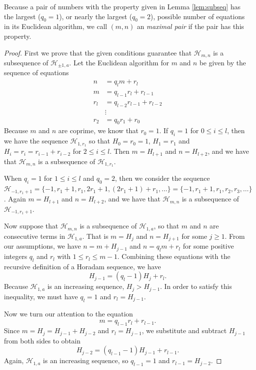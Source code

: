 \documentclass{amsart}
\begin{document}
Because a pair of numbers with the property given in Lemma \ref{lem:subseq} has the largest ($q_0 = 1$), or nearly the largest ($q_0 = 2$), possible number of equations in its Euclidean algorithm, we call $(m,n)$ an \textit{maximal pair} if the pair has this property. 

\begin{proof}
First we prove that the given conditions guarantee that $\mathcal H_{m,n}$ is a subsequence of $\mathcal H_{\pm 1, a}$. Let the Euclidean algorithm for $m$ and $n$ be given by the sequence of equations 
 \begin{align*} 
n &=   q_l m + r_l\\ 
m &=  q_{l-1} r_l + r_{l-1} \\
r_l &= q_{l-2} r_{l-1} + r_{l-2} \\
& \vdots \\
r_2 &= q_0 r_1 + r_0
\end{align*}
Because $m$ and $n$ are coprime, we know that $r_0 = 1$. If $q_i = 1$ for $0\le i \le l$, then we have the sequence $\mathcal H_{1, r_1}$ so that $H_0 = r_0 = 1$, $H_1 = r_1$ and $H_i = r_i = r_{i - 1} + r_{i-2}$ for $2 \le i \le l$. Then $m = H_{l+1}$ and $n = H_{l+2}$, and we have that $\mathcal H_{m,n}$ is a subsequence of $\mathcal H_{1, r_1}$.

When $q_i = 1$ for $1\le i \le l$ and $q_0 = 2$, then we consider the sequence $\mathcal H_{-1, r_1 + 1} = \{-1, r_1 + 1, r_1,  2r_1 + 1, (2r_1 + 1) + r_1, \ldots \} = \{-1, r_1 + 1, r_1,  r_2, r_3, \ldots \}$. Again $m = H_{l+1}$ and $n = H_{l+2}$, and we have that $\mathcal H_{m,n}$ is a subsequence of $\mathcal H_{-1, r_1 + 1}$.

Now suppose that $\mathcal H_{m,n}$ is a subsequence of $\mathcal H_{1, a}$, so that $m$ and $n$ are consecutive terms in $\mathcal H_{1, a}$. That is $m = H_j $ and $n = H_{j+1} $ for some $j\ge 1$. From our assumptions, we have $n = m + H_{j-1}$ and $n = q_l m + r_l$ for some positive integers $q_l$ and $r_l$ with $1\le r_l \le m-1$. Combining these equations with the recursive definition of a Horadam sequence, we have  $$H_{j-1} = (q_l - 1) H_j + r_l .$$ Because $\mathcal H_{1, a}$ is an increasing sequence, $H_{j} > H_{j-1} $. In order to satisfy this inequality, we must have $q_l = 1$ and $r_l = H_{j-1}$. 

Now we turn our attention to the equation $$m = q_{l-1} r_l + r_{l-1}.$$ Since $m = H_j = H_{j-1} + H_{j-2}$ and $r_l = H_{j-1}$, we substitute and subtract $H_{j-1}$ from both sides to obtain $$H_{j-2} = (q_{l-1}-1) H_{j-1} + r_{l-1}.$$ 
Again, $\mathcal H_{1,a}$ is an increasing sequence, so $q_{l-1} = 1$ and $r_{l-1}= H_{j-2}$.


\end{proof}
\end{document}
